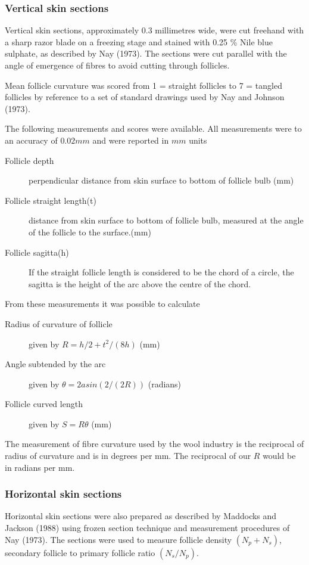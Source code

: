 \documentclass{article}
\begin{document}
\subsubsection{Vertical skin sections}
Vertical skin sections, approximately 0.3 millimetres wide, were cut freehand with a sharp razor blade on a freezing stage and stained with 0.25 \% Nile blue sulphate, as described by Nay (1973).  The sections were cut parallel with the angle of emergence of fibres to avoid cutting through follicles.

 Mean follicle curvature was scored from 1 = straight follicles to 7 = tangled follicles by reference to a set of standard drawings used by Nay and Johnson (1973).  

The following measurements and scores were available.  All measurements were to an accuracy of $0.02mm$ and were reported in $mm$ units
\begin{description}
\item[Follicle depth] perpendicular distance from skin surface to bottom of follicle bulb (mm)
\item[Follicle straight length(t)] distance from skin surface to bottom of follicle bulb, measured at the angle of the follicle to the surface.(mm)
\item[Follicle sagitta(h)] If the straight follicle length is considered to be the chord of a circle, the sagitta is the height of the arc above the centre of the chord.
\end{description}

From these measurements it was possible to calculate
\begin{description}
\item[Radius of curvature of follicle]  given by $R = h/2 + t^{2}/(8h)$ (mm)
\item[Angle subtended by the arc] given by $\theta = 2 asin(2/(2R))$ (radians)
\item[Follicle curved length] given by $S = R \theta$ (mm)
\end{description}

The measurement of fibre curvature used by the wool industry is the reciprocal of radius of curvature and is in degrees per mm. The reciprocal of our $R$ would be in radians per mm.


\subsubsection{Horizontal skin sections}
Horizontal skin sections were also prepared as described by
Maddocks and Jackson (1988) using frozen section technique and
measurement procedures of Nay (1973). The sections were used to measure
follicle density $(N_{p} + N_{s})$, secondary follicle to primary follicle ratio $(N_{s}/N_{p})$.
 
\end{document}
